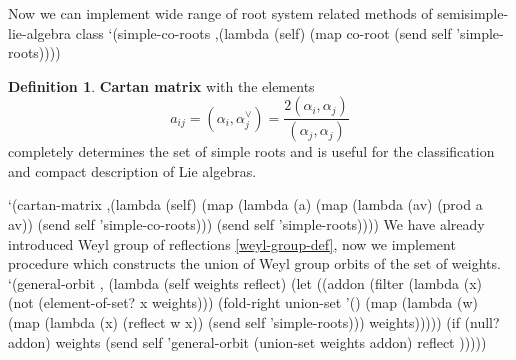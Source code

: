 \documentclass[a4paper,10pt]{article}%
\theoremstyle{definition} \newtheorem{Def}{Definition}
\begin{document}
Now we can implement wide range of root system related methods of {\Tt{}semisimple-lie-algebra\nwendquote} class
\nwenddocs{}\endmoddef\nwstartdeflinemarkup{}\nwenddeflinemarkup
`(simple-co-roots ,(lambda (self)
              (map co-root (send self 'simple-roots))))
\nwendcode{}\nwdocspar
\begin{Def}
  {\bf Cartan matrix} with the elements
  \begin{equation}
    \label{eq:7}
    a_{ij}=(\alpha_i,\alpha_j^{\vee})=\frac{2(\alpha_i,\alpha_j)}{(\alpha_j,\alpha_j)}
  \end{equation}
  completely determines the set of simple roots and is useful for the classification and compact description of Lie algebras.
\end{Def}
\nwenddocs{}\plusendmoddef\nwstartdeflinemarkup{}\nwenddeflinemarkup
`(cartan-matrix
  ,(lambda (self)
     (map (lambda (a)
            (map (lambda (av) (prod a av)) (send self 'simple-co-roots)))
         (send self 'simple-roots))))
\nwendcode{}\nwdocspar
We have already introduced Weyl group of reflections \ref{weyl-group-def}, now we implement procedure which constructs the union of Weyl group orbits of the set of weights.
\nwenddocs{}\plusendmoddef\nwstartdeflinemarkup{}\nwenddeflinemarkup
`(general-orbit , (lambda (self weights reflect)
    (let ((addon 
           (filter (lambda (x) (not (element-of-set? x weights)))
                   (fold-right union-set '() 
                               (map (lambda (w)
                                      (map
                                       (lambda (x) (reflect w x))
                                       (send self 'simple-roots)))
                                    weights)))))
      (if (null? addon)
          weights
          (send self 'general-orbit (union-set weights addon) reflect )))))
\end{document}

